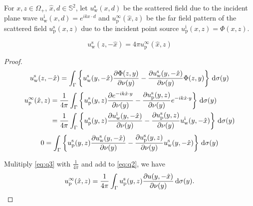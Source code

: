 
For $x, z\in\Omega_+$, $\hat{x}, d\in\mathbb{S}^2$, let $u_\text{w}^\text{s}(x, d)$ be the scattered field due to the incident plane wave $u_\text{w}^\text{i}(x, d) = e^{ikx\cdot d}$ and $u_\text{p}^\infty(\hat{x}, z)$ be the far field pattern of the scattered field $u_\text{p}^\text{s}(x, z)$ due to the incident point source $u_\text{p}^\text{i}(x, z) = \Phi(x, z)$.

\begin{thm}
  $$u_\text{w}^\text{s}(z, -\hat{x}) = 4\pi u_\text{p}^\infty(\hat{x}, z)$$
\end{thm}

\begin{proof}
  \begin{align}
    u_\text{w}^\text{s}(z, -\hat{x}) = \int_{\Gamma}\left\{u_\text{w}^\text{s}(y, -\hat{x})\frac{\partial\Phi(z, y)}{\partial\nu(y)} - \frac{\partial u_\text{w}^\text{s}(y, -\hat{x})}{\partial\nu(y)}\Phi(z, y)\right\}\,\text{d}\sigma(y)\label{eq:q1}
  \end{align}
  \begin{align}
    u_\text{p}^\infty(\hat{x}, z) &= \frac{1}{4\pi}\int_{\Gamma}\left\{u_\text{p}^\text{s}(y, z)\frac{\partial e^{-ik\hat{x}\cdot y}}{\partial\nu(y)} - \frac{\partial u_\text{p}^\text{s}(y, z)}{\partial\nu(y)}e^{-ik\hat{x}\cdot y}\right\}\,\text{d}\sigma(y) \\ &=\frac{1}{4\pi}\int_{\Gamma}\left\{u_\text{p}^\text{s}(y, z)\frac{\partial u_\text{w}^\text{i}(y, -\hat{x})}{\partial\nu(y)} - \frac{\partial u_\text{p}^\text{s}(y, z)}{\partial\nu(y)}u_\text{w}^\text{i}(y, -\hat{x})\right\}\,\text{d}\sigma(y)\label{eq:q2}
  \end{align}
  \begin{align}
    0 = \int_{\Gamma}\left\{u_\text{p}^\text{s}(y, z)\frac{\partial u_\text{w}^\text{s}(y, -\hat{x})}{\partial\nu(y)} - \frac{\partial u_\text{p}^\text{s}(y, z)}{\partial\nu(y)}u_\text{w}^\text{s}(y, -\hat{x})\right\}\,\text{d}\sigma(y)\label{eq:q3}
  \end{align}

  Mulitiply \eqref{eq:q3} with $\frac{1}{4\pi}$ and add to \eqref{eq:q2}, we have 
  \begin{align}
    u_\text{p}^\infty(\hat{x}, z) = \frac{1}{4\pi}\int_{\Gamma}u_\text{p}^\text{s}(y, z)\frac{\partial u(y, -\hat{x})}{\partial\nu(y)}\,\text{d}\sigma(y).\label{eq:q4}
  \end{align}

\end{proof}

